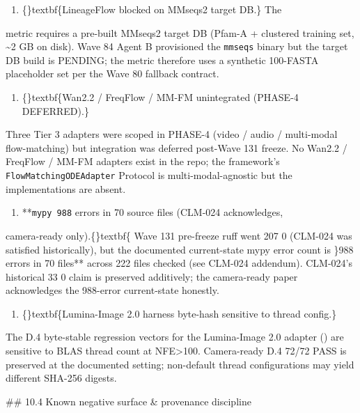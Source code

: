 \documentclass{article}
\begin{document}
\begin{enumerate}
\item \{\}textbf\{LineageFlow  blocked on MMseqs2 target DB.\} The
\end{enumerate}
metric requires a pre-built MMseqs2 target DB (Pfam-A + clustered training set, \textasciitilde{}2 GB on disk). Wave 84 Agent B provisioned the \texttt{mmseqs} binary but the target DB build is PENDING; the metric therefore uses a synthetic 100-FASTA placeholder set per the Wave 80 fallback contract.

\begin{enumerate}
\item \{\}textbf\{Wan2.2 / FreqFlow / MM-FM unintegrated (PHASE-4 DEFERRED).\}
\end{enumerate}
Three Tier 3 adapters were scoped in PHASE-4 (video / audio / multi-modal flow-matching) but integration was deferred post-Wave 131 freeze. No Wan2.2 / FreqFlow / MM-FM adapters exist in the repo; the framework's \texttt{FlowMatchingODEAdapter} Protocol is multi-modal-agnostic but the implementations are absent.

\begin{enumerate}
\item **\texttt{mypy 988} errors in 70 source files (CLM-024 acknowledges,
\end{enumerate}
camera-ready only).\{\}textbf\{ Wave 131 pre-freeze ruff went 207  0 (CLM-024 was satisfied historically), but the documented current-state mypy error count is \}988 errors in 70 files** across 222 files checked (see  CLM-024 addendum). CLM-024's historical 33  0 claim is preserved additively; the camera-ready paper acknowledges the 988-error current-state honestly.

\begin{enumerate}
\item \{\}textbf\{Lumina-Image 2.0 harness byte-hash sensitive to thread config.\}
\end{enumerate}
The  D.4 byte-stable regression vectors for the Lumina-Image 2.0 adapter () are sensitive to BLAS thread count at NFE>100. Camera-ready D.4 72/72 PASS is preserved at the documented  setting; non-default thread configurations may yield different SHA-256 digests.

\#\# 10.4 Known negative surface \& provenance discipline
\end{document}
